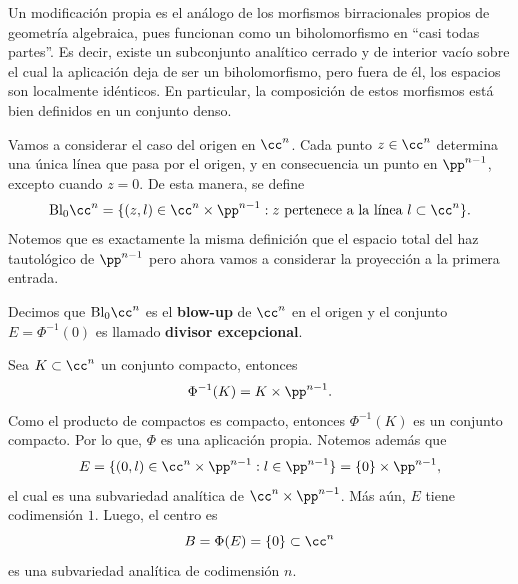 Un modificación propia es el análogo de los morfismos birracionales	 propios de geometría algebraica, pues funcionan como un biholomorfismo en \enquote{casi todas partes}. Es decir, existe un subconjunto analítico cerrado y de interior vacío sobre el cual la aplicación deja de ser un biholomorfismo, pero fuera de él, los espacios son localmente idénticos. En particular, la composición de estos morfismos está bien definidos en un conjunto denso.

\begin{example}[Blow up]
	Vamos a considerar el caso del origen en $\cc^n$. Cada punto $z\in \cc^n$ determina una única línea que pasa por el origen, y en consecuencia un punto en $\pp^{n-1}$, excepto cuando $z=0$. De esta manera, se define
	\begin{equation*}
		\mathrm{Bl}_0\cc^n=\{(z,l)\in\cc^n\times\pp^{n-1}:z\text{ pertenece a la línea }l\subset\cc^n\}.
	\end{equation*}
	Notemos que es exactamente la misma definición que el espacio total del haz tautológico de $\pp^{n-1}$ pero ahora vamos a considerar la proyección a la primera entrada.	
	
	Decimos que $\mathrm{Bl}_0\cc^n$ es el \textbf{blow-up} de $\cc^n$ en el origen y el conjunto $E=\Phi^{-1}(0)$ es llamado \textbf{divisor excepcional}.
	
	Sea $K\subset\cc^n$ un conjunto compacto, entonces
	\begin{equation*}
		\Phi^{-1}(K)=K\times \pp^{n-1}.
	\end{equation*}
	Como el producto de compactos es compacto, entonces $\Phi^{-1}(K)$ es un conjunto compacto. Por lo que, $\Phi$ es una aplicación propia. Notemos además que
	\begin{equation*}
		E=\{(0,l)\in\cc^n\times\pp^{n-1}:l\in\pp^{n-1}\}=\{0\}\times\pp^{n-1},
	\end{equation*}
	el cual es una subvariedad analítica de $\cc^n\times\pp^{n-1}$. Más aún, $E$ tiene codimensión $1$. Luego, el centro es
	\begin{equation*}
		B=\Phi(E)=\{0\}\subset\cc^n
	\end{equation*}
	es una subvariedad analítica de codimensión $n$.
	

\end{example}
